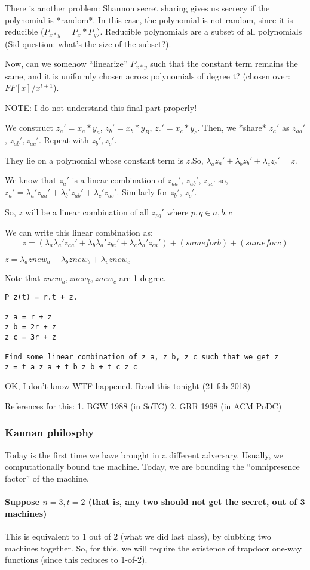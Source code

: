 There is another problem: Shannon secret sharing gives us secrecy if the polynomial is *random*.
In this case, the polynomial is not random, since it is reducible ($P_{x * y} = P_x * P_y$). Reducible
polynomials are a subset of all polynomials (Sid question: what's the size of the subset?).


Now, can we somehow ``linearize'' $P_{x * y}$ such that the  constant term remains the same,
and it is uniformly chosen across polynomials of degree t? (chosen over: $FF[x] / x^{t+1}$).


NOTE: I do not understand this final part properly!


We construct $z_a' = x_a * y_a$, $z_b' = x_b * y_B$, $z_c' = x_c * y_c$.
Then, we *share* $z_a'$ as $z_{aa}'$, $z_{ab}', z_{ac}'$. Repeat with $z_{b}', z_{c}'$.

They lie on a polynomial whose constant term is $z$.So,
$\lambda_a z_a' + \lambda_b z_b' + \lambda_c z_c' = z$.

We know that $z_a'$ is a linear combination of $z_{aa}'$, $z_{ab}'$, $z_{ac'}$
so, $z_a' = \lambda_a' z_{aa}' + \lambda_b' z_{ab}' + \lambda_c' z_{ac}'$.
Similarly for $z_b'$, $z_c'$.


So, $z$ will be a linear combination of all $z_{pq}'$ where $p, q \in {a, b, c}$

We can write this linear combination as:
$$z = (\lambda_a \lambda_a' z_{aa}' +
     \lambda_b \lambda_a' z_{ba}' +
     \lambda_c \lambda_a' z_{ca}') +
     (same for b) +
     (same for c)$$

$z = \lambda_a znew_a + \lambda_b znew_b + \lambda_c znew_c$

Note that $znew_a, znew_b, znew_c$ are 1 degree.



\begin{verbatim}
P_z(t) = r.t + z.

z_a = r + z
z_b = 2r + z
z_c = 3r + z

Find some linear combination of z_a, z_b, z_c such that we get z
z = t_a z_a + t_b z_b + t_c z_c
\end{verbatim}

OK, I don't know WTF happened. Read this tonight (21 feb 2018)



References for this:
1. BGW 1988 (in SoTC)
2. GRR 1998 (in ACM PoDC)

\subsubsection{Kannan philosphy}
Today is the first time we have brought in a different adversary. Usually, we computationally bound the machine.
Today, we are bounding the ``omnipresence factor'' of the machine.


\paragraph{Suppose $n = 3, t = 2$ (that is, any two should not get the secret, out of 3 machines)}
This is equivalent to 1 out of 2 (what we did last class), by clubbing two machines together.
So, for this, we will require the existence of trapdoor one-way functions (since this reduces to 1-of-2).


